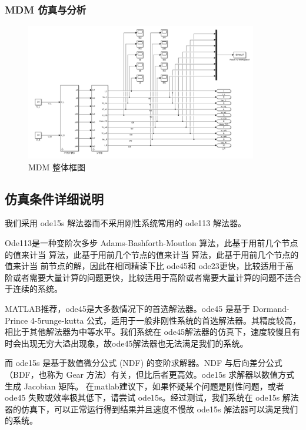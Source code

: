 \begin{itemize}
	
	
	\subsubsection{MDM 仿真与分析}
	
	\begin{figure}[htbp]
		\centering
		\includegraphics[width=0.9\textwidth]{fig/simulink/MDM_simulink1.png}
		\caption{MDM 整体框图}\label{fig:MDM_simulink}
	\end{figure}
	
	\clearpage
	\subsection{仿真条件详细说明} 
	
	我们采用 ode15s 解法器而不采用刚性系统常用的 ode113 解法器。 
	
	Ode113是一种变阶次多步 Adams-Bashforth-Moutlon 算法，此基于用前几个节点的值来计当 算法，此基于用前几个节点的值来计当 算法，此基于用前几个节点的值来计当 前节点的解，因此在相同精读下比 ode45和 ode23更快，比较适用于高阶或者需要大量计算的问题更快，比较适用于高阶或者需要大量计算的问题不适合于连续的系统。
	
	MATLAB推荐，ode45是大多数情况下的首选解法器。ode45 是基于 Dormand-Prince 4-5runge-kutta 公式，适用于一般非刚性系统的首选解法器。其精度较高，相比于其他解法器为中等水平。我们系统在 ode45解法器的仿真下，速度较慢且有时会出现无穷大溢出现象，故ode45解法器也无法满足我们的系统。
	
	而 ode15s 是基于数值微分公式 (NDF) 的变阶求解器。NDF 与后向差分公式（BDF，也称为 Gear 方法）有关，但比后者更高效。ode15s 求解器以数值方式生成 Jacobian 矩阵。
	在matlab建议下，如果怀疑某个问题是刚性问题，或者 ode45 失败或效率极其低下，请尝试 ode15s。经过测试，我们系统在 ode15s 解法器的仿真下，可以正常运行得到结果并且速度不慢故 ode15s 解法器可以满足我们的系统。
	
\end{itemize}
